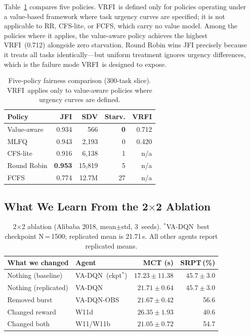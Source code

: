 \documentclass[10pt,twocolumn]{article}
\theoremstyle{remark}
\newcommand{\vrfi}{\textsc{VRFI}}
\newcommand{\vadqn}{VA-DQN}
\newcommand{\vaobs}{VA-DQN-OBS}
\begin{document}
Table~\ref{tab:fair} compares five policies. \vrfi\ is defined only
for policies operating under a value-based framework where task
urgency curves are specified; it is not applicable to RR, CFS-lite,
or FCFS, which carry no value model. Among the policies where it
applies, the value-aware policy achieves the highest \vrfi\ (0.712)
alongside zero starvation. Round Robin wins JFI precisely because it
treats all tasks identically---but uniform treatment ignores urgency
differences, which is the failure mode \vrfi\ is designed to expose.

\begin{table}[h]
\centering
\caption{Five-policy fairness comparison (300-task slice). \vrfi\
applies only to value-aware policies where urgency curves are
defined.}
\label{tab:fair}
\small
\begin{tabular}{lrrrr}
\toprule
Policy & JFI & SDV & Starv. & \vrfi \\
\midrule
Value-aware & 0.934 & 566 & \textbf{0} & 0.712 \\
MLFQ & 0.943 & 2,193 & 0 & 0.420 \\
CFS-lite & 0.916 & 6,138 & 1 & n/a \\
Round Robin & \textbf{0.953} & 15,819 & 5 & n/a \\
FCFS & 0.774 & 12.7M & 27 & n/a \\
\bottomrule
\end{tabular}
\end{table}

\subsection{What We Learn From the 2$\times$2 Ablation}
\label{sec:2x2}

\begin{table}[t]
\centering
\caption{2$\times$2 ablation (Alibaba 2018, mean$\pm$std, 3~seeds).
$^*$\vadqn\ best checkpoint N\,=\,1500; replicated mean is 21.71\,s.
All other agents report replicated means.}
\label{tab:2x2}
\small
\begin{tabular}{llrr}
\toprule
What we changed & Agent & MCT (s) & SRPT\,(\%) \\
\midrule
Nothing (baseline)   & \vadqn\ (ckpt$^*$) & $17.23\pm11.38$ & $45.7\pm3.0$ \\
Nothing (replicated) & \vadqn             & $21.71\pm0.64$  & $45.7\pm3.0$ \\
Removed burst        & \vaobs             & $21.67\pm0.42$  & 56.6 \\
Changed reward       & W11d               & $26.35\pm1.93$  & 40.6 \\
Changed both         & W11/W11b           & $21.05\pm0.72$  & 54.7 \\
\bottomrule
\end{tabular}
\end{table}
\end{document}
